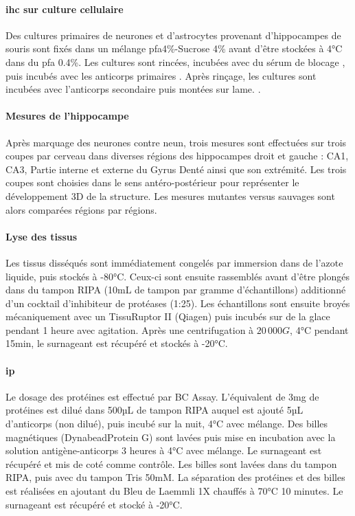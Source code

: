 \paragraph{\Acrlong{ihc} sur culture cellulaire}
\label{par:ihcculture}
	Des cultures primaires de neurones et d'astrocytes provenant d'hippocampes de souris sont fixés dans un mélange \gls{pfa}4\%-Sucrose 4\% avant d'être stockées à 4°C dans du \gls{pfa} 0.4\%. Les cultures sont rincées, incubées avec du sérum de blocage , puis incubés avec les anticorps primaires . Après rinçage, les cultures sont incubées avec l'anticorps secondaire puis montées sur lame. .
	
\paragraph{Mesures de l'hippocampe}
\label{par:hippNeuN}
	Après marquage des neurones contre \acrshort{neun}, trois mesures sont effectuées sur trois coupes par cerveau dans diverses régions des hippocampes droit et gauche : CA1, CA3, Partie interne et externe du Gyrus Denté ainsi que son extrémité. Les trois coupes sont choisies dans le sens antéro-postérieur pour représenter le développement 3D de la structure. Les mesures mutantes versus sauvages sont alors comparées régions par régions.
	
\paragraph{Lyse des tissus}
\label{par:lyse}
	Les tissus disséqués sont immédiatement congelés par immersion dans de l'azote liquide, puis stockés à -80°C. Ceux-ci sont ensuite rassemblés avant d'être plongés dans du tampon RIPA (10mL de tampon par gramme d'échantillons) additionné d'un cocktail d'inhibiteur de protéases (1:25). Les échantillons sont ensuite broyés mécaniquement avec un TissuRuptor II (Qiagen\textregistered) puis incubés sur de la glace pendant 1 heure avec agitation. Après une centrifugation à $20\,000G$, 4°C pendant 15min, le surnageant est récupéré et stockés à -20°C. 
	
\paragraph{\Acrlong{ip}}
\label{par:ip}
	Le dosage des protéines est effectué par BC Assay. L'équivalent de 3mg de protéines est dilué dans 500µL de tampon RIPA auquel est ajouté 5µL d'anticorps (non dilué), puis incubé sur la nuit, 4°C avec mélange. Des billes magnétiques (Dynabead\textregistered Protein G) sont lavées puis mise en incubation avec la solution antigène-anticorps 3 heures à 4°C avec mélange. Le surnageant est récupéré et mis de coté comme contrôle. Les billes sont lavées dans du tampon RIPA, puis avec du tampon Tris 50mM. La séparation des protéines et des billes est réalisées en ajoutant du Bleu de Laemmli 1X chauffés à 70°C 10 minutes. Le surnageant est récupéré et stocké à -20°C. 
	
